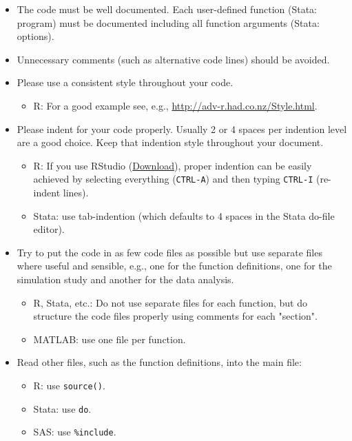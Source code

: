 \documentclass[12pt,a4paper]{article}
\begin{document}
\begin{itemize}
\item The code {must} be well documented. Each user-defined function
  (\textsf{Stata}: program) {must} be documented including all function
  arguments (\textsf{Stata}: options).
\item Unnecessary comments (such as alternative code lines) {should} be
  avoided.
\item Please use a consistent style throughout your code.
  \begin{itemize}
  \item \textsf{R}: For a good example see, e.g.,
    \url{http://adv-r.had.co.nz/Style.html}.
  \end{itemize}
 \item Please indent for your code properly. Usually 2 or 4 spaces per indention
  level are a good choice. Keep that indention style throughout your document.
  \begin{itemize}
  \item \textsf{R}: If you use RStudio
    (\href{http://www.rstudio.com/products/rstudio/download/}{Download}), proper
    indention can be easily achieved by selecting everything (\texttt{CTRL-A})
    and then typing \texttt{CTRL-I} (re-indent lines).
  \item \textsf{Stata}: use tab-indention (which defaults to 4 spaces in the
    \textsf{Stata} do-file editor).
  \end{itemize}
\item Try to put the code in as few code files as possible but use separate
  files where useful and sensible, e.g., one for the function definitions, one
  for the simulation study and another for the data analysis.
  \begin{itemize}
  \item \textsf{R}, \textsf{Stata}, etc.: Do not use separate files for each function,
    but do structure the code files properly using comments for each "section".
  \item \textsf{MATLAB}: use one file per function.
  \end{itemize}
\item Read other files, such as the function definitions, into the main file:
  \begin{itemize}
  \item \textsf{R}: use \texttt{source()}.
  \item \textsf{Stata}: use \texttt{do}.
  \item \textsf{SAS}: use \texttt{\%include}.

\end{itemize}
\end{itemize}
\end{document}
